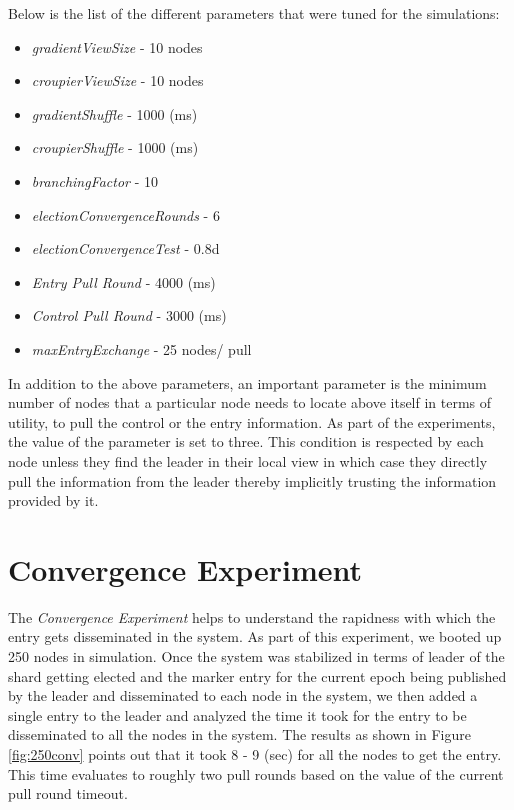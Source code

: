 \documentclass[12pt,a4paper,twoside,openright]{book}
\begin{document}
Below is the list of the different parameters that were tuned for the simulations:


\begin{itemize}
\setlength\itemsep{0em}
\item \textit{gradientViewSize} - 10 nodes
\item \textit{croupierViewSize} - 10 nodes
\item \textit{gradientShuffle} - 1000 (ms)
\item \textit{croupierShuffle} - 1000 (ms)
\item \textit{branchingFactor} - 10
\item \textit{electionConvergenceRounds} - 6
\item \textit{electionConvergenceTest} - 0.8d
\item \textit{Entry Pull Round} - 4000 (ms)
\item \textit{Control Pull Round} - 3000 (ms)
\item \textit{maxEntryExchange} - 25 nodes/ pull
\end{itemize}

In addition to the above parameters, an important parameter is the minimum number of nodes that a particular node needs to locate above itself in terms of utility, to pull the control or the entry information. As part of the experiments, the value of the parameter is set to three. This condition is respected by each node unless they find the leader in their local view in which case they directly pull the information from the leader thereby implicitly trusting the information provided by it.


\section{Convergence Experiment}

The \textit{Convergence Experiment} helps to understand the rapidness with which the entry gets disseminated in the system. As part of this experiment, we booted up 250 nodes in simulation. Once the system was stabilized in terms of leader of the shard getting elected and the marker entry for the current epoch being published by the leader and disseminated to each node in the system, we then added a single entry to the leader and analyzed the time it took for the entry to be disseminated to all the nodes in the system. The results as shown in Figure \ref{fig:250conv} points out that it took 8 - 9 (sec) for all the nodes to get the entry. This time evaluates to roughly two pull rounds based on the value of the current pull round timeout.
\end{document}

